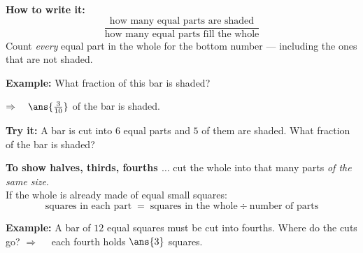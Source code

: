 \documentclass[12pt]{article}
\begin{document}
\begin{formulabox}
\textbf{How to write it:}
\[
\frac{\text{how many equal parts are shaded}}{\text{how many equal parts fill the whole}}
\]
Count \emph{every} equal part in the whole for the bottom number --- including
the ones that are not shaded.
\end{formulabox}

\begin{examplebox}
\textbf{Example:} What fraction of this bar is shaded?
\begin{center}
\end{center}
$\Rightarrow\quad \ans{\tfrac{3}{10}}$ of the bar is shaded.
\end{examplebox}

\begin{tryitbox}
\textbf{Try it:} A bar is cut into $6$ equal parts and $5$ of them are shaded.
What fraction of the bar is shaded?\\[2pt]
\end{tryitbox}


\begin{formulabox}
\textbf{To show halves, thirds, fourths $\ldots$} cut the whole into that many
parts \emph{of the same size}.\\[3pt]
If the whole is already made of equal small squares:
\[
\text{squares in each part} \;=\; \text{squares in the whole} \div \text{number of parts}
\]
\end{formulabox}

\begin{examplebox}
\textbf{Example:} A bar of $12$ equal squares must be cut into fourths. Where
do the cuts go?
$\Rightarrow\quad$ each fourth holds $\ans{3}$ squares.
\end{examplebox}
\end{document}
